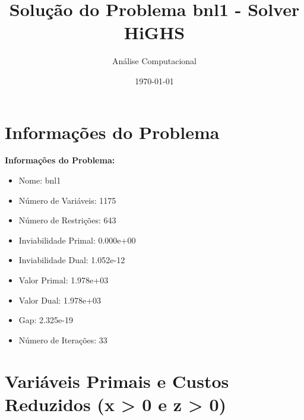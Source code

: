 \documentclass[12pt]{article}
\title{Solução do Problema bnl1 - Solver HiGHS}
\author{Análise Computacional}
\date{\today}
\begin{document}
\maketitle

\section{Informações do Problema}

\textbf{Informações do Problema:}
\begin{itemize}
\item Nome: bnl1
\item Número de Variáveis: 1175
\item Número de Restrições: 643
\item Inviabilidade Primal: 0.000e+00
\item Inviabilidade Dual: 1.052e-12
\item Valor Primal: 1.978e+03
\item Valor Dual: 1.978e+03
\item Gap: 2.325e-19
\item Número de Iterações: 33
\end{itemize}


\section{Variáveis Primais e Custos Reduzidos (x > 0 e z > 0)}
\end{document}
